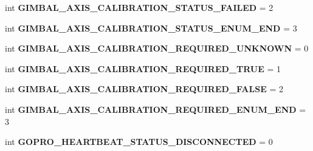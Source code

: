 \begin{DoxyCompactItemize}
\item 
\mbox{\label{namespacepymavlink_1_1dialects_1_1v10_ab9990324e543f09e266feb903947f752}} 
int {\bfseries G\+I\+M\+B\+A\+L\+\_\+\+A\+X\+I\+S\+\_\+\+C\+A\+L\+I\+B\+R\+A\+T\+I\+O\+N\+\_\+\+S\+T\+A\+T\+U\+S\+\_\+\+F\+A\+I\+L\+ED} = 2
\item 
\mbox{\label{namespacepymavlink_1_1dialects_1_1v10_a6f29ae888100c91d1d6a27d503d75aae}} 
int {\bfseries G\+I\+M\+B\+A\+L\+\_\+\+A\+X\+I\+S\+\_\+\+C\+A\+L\+I\+B\+R\+A\+T\+I\+O\+N\+\_\+\+S\+T\+A\+T\+U\+S\+\_\+\+E\+N\+U\+M\+\_\+\+E\+ND} = 3
\item 
\mbox{\label{namespacepymavlink_1_1dialects_1_1v10_adbab46ba3fb5207990ebc4d652f24ed3}} 
int {\bfseries G\+I\+M\+B\+A\+L\+\_\+\+A\+X\+I\+S\+\_\+\+C\+A\+L\+I\+B\+R\+A\+T\+I\+O\+N\+\_\+\+R\+E\+Q\+U\+I\+R\+E\+D\+\_\+\+U\+N\+K\+N\+O\+WN} = 0
\item 
\mbox{\label{namespacepymavlink_1_1dialects_1_1v10_a2773ecb11d7709aba4da6b9a363037db}} 
int {\bfseries G\+I\+M\+B\+A\+L\+\_\+\+A\+X\+I\+S\+\_\+\+C\+A\+L\+I\+B\+R\+A\+T\+I\+O\+N\+\_\+\+R\+E\+Q\+U\+I\+R\+E\+D\+\_\+\+T\+R\+UE} = 1
\item 
\mbox{\label{namespacepymavlink_1_1dialects_1_1v10_a2ff829d43e5dc410652bcc2f33c96bae}} 
int {\bfseries G\+I\+M\+B\+A\+L\+\_\+\+A\+X\+I\+S\+\_\+\+C\+A\+L\+I\+B\+R\+A\+T\+I\+O\+N\+\_\+\+R\+E\+Q\+U\+I\+R\+E\+D\+\_\+\+F\+A\+L\+SE} = 2
\item 
\mbox{\label{namespacepymavlink_1_1dialects_1_1v10_a75428b4b87f960804eed91845eb77ee7}} 
int {\bfseries G\+I\+M\+B\+A\+L\+\_\+\+A\+X\+I\+S\+\_\+\+C\+A\+L\+I\+B\+R\+A\+T\+I\+O\+N\+\_\+\+R\+E\+Q\+U\+I\+R\+E\+D\+\_\+\+E\+N\+U\+M\+\_\+\+E\+ND} = 3
\item 
\mbox{\label{namespacepymavlink_1_1dialects_1_1v10_aa9db2afbdec031b0a2e976705f8adf89}} 
int {\bfseries G\+O\+P\+R\+O\+\_\+\+H\+E\+A\+R\+T\+B\+E\+A\+T\+\_\+\+S\+T\+A\+T\+U\+S\+\_\+\+D\+I\+S\+C\+O\+N\+N\+E\+C\+T\+ED} = 0
\item 
\mbox{\label{namespacepymavlink_1_1dialects_1_1v10_a4fa88fb631c55123e9565bc69eab7f71}} 

\end{DoxyCompactItemize}
